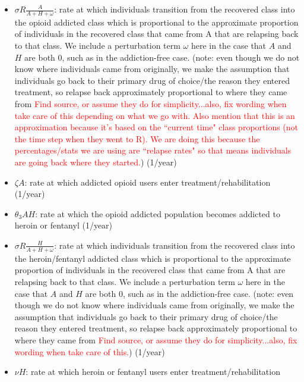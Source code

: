 \documentclass[12pt]{article}
\begin{document}
\begin{itemize}
\item $\sigma R \frac{A}{A+H+\omega}$: rate at which individuals transition from the recovered class into the opioid addicted class which is proportional to the approximate proportion of individuals in the recovered class that came from A that are relapsing back to that class. We include a perturbation term $\omega$ here in the case that $A$ and $H$ are both 0, such as in the addiction-free case. (note: even though we do not know where individuals came from originally, we make the assumption that individuals go back to their primary drug of choice/the reason they entered treatment, so relapse back approximately proportional to where they came from \textcolor{red}{Find source, or assume they do for simplicity...also, fix wording when take care of this depending on what we go with. Also mention that this is an approximation because it's based on the ``current time" class proportions (not the time step when they went to R). We are doing this because the percentages/stats we are using are ``relapse rates" so that means individuals are going back where they started.}) (1/year)
\item $\zeta A$: rate at which addicted opioid users enter treatment/rehabilitation (1/year)
\item $\theta_3 AH$: rate at which the opioid addicted population becomes addicted to heroin or fentanyl  (1/year)
\item $\sigma R \frac{H}{A+H+\omega}$: rate at which individuals transition from the recovered class into the heroin/fentanyl addicted class which is proportional to the approximate proportion of individuals in the recovered class that came from A that are relapsing back to that class. We include a perturbation term $\omega$ here in the case that $A$ and $H$ are both 0, such as in the addiction-free case. (note: even though we do not know where individuals came from originally, we make the assumption that individuals go back to their primary drug of choice/the reason they entered treatment, so relapse back approximately proportional to where they came from \textcolor{red}{Find source, or assume they do for simplicity...also, fix wording when take care of this.}) (1/year)
\item $\nu H$: rate at which heroin or fentanyl users enter treatment/rehabilitation 
\end{itemize} 
\end{document}
